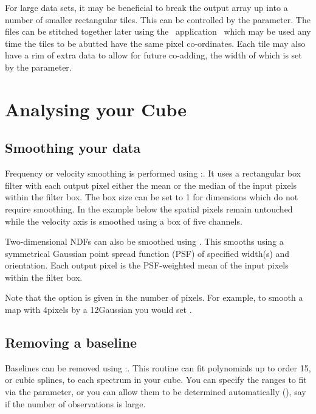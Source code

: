 \documentclass[11pt,oneside,chapters]{starlink}
\providecommand{\mfittrend}{\xref{\task{mfittrend}}{sun95}{MFITTREND}}
\begin{document}
For large data sets, it may be beneficial to break the output array up
into a number of smaller rectangular tiles. This can be controlled by
the  parameter.  The files can be stitched together
later using the \Kappa\ application \paste\ which may be used any time
the tiles to be abutted have the same pixel co-ordinates.  Each tile
may also have a rim of extra data to allow for future co-adding,
the width of which is set by the  parameter.


\clearpage
\chapter{Analysing your Cube}
\label{sec:analyse}

\section{Smoothing your data}

Frequency or velocity smoothing is performed using \Kappa:\block. It
uses a rectangular box filter with each output pixel either the mean
or the median of the input pixels within the filter box. The box size
can be set to 1 for dimensions which do not require smoothing. In the
example below the spatial pixels remain untouched while the velocity
axis is smoothed using a box of five channels.
\begin{terminalv}
\end{terminalv}

Two-dimensional NDFs can also be smoothed using \gausmooth. This
smooths using a symmetrical Gaussian point spread function (PSF) of
specified width(s) and orientation. Each output pixel is the
PSF-weighted mean of the input pixels within the filter box.

\begin{terminalv}
\end{terminalv}
Note that the  option is given in the number of pixels.
For example, to smooth a map with 4\arcsec pixels by a 12\arcsec Gaussian
you would set .

\section{Removing a baseline}

Baselines can be removed using \Kappa:\mfittrend. This routine can
fit polynomials up to order 15, or cubic splines, to each spectrum in
your cube. You can specify the ranges to fit via the 
parameter, or you can allow them to be determined automatically
(), say if the number of observations is large.
\end{document}
